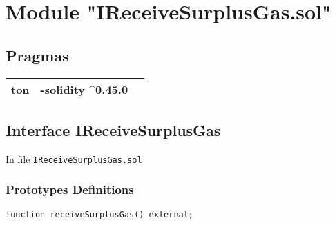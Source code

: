 
\section{Module "IReceiveSurplusGas.sol"}


\subsection{Pragmas}


\noindent\begin{tabular}{|l|l|p{5cm}|}\hline
ton & -solidity \^{}0.45.0 &\\\hline
\end{tabular}


\subsection{Interface IReceiveSurplusGas}


In file {\tt IReceiveSurplusGas.sol}

\subsubsection{Prototypes Definitions}

\vspace{2cm}

\begin{lstlisting}[firstnumber=4]
 function receiveSurplusGas() external;
\end{lstlisting}
